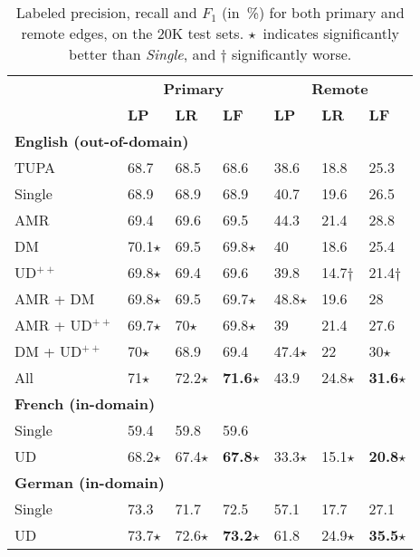 \documentclass[11pt,a4paper]{article}
\begin{document}
\begin{table}[t]
\centering
\small
\setlength\tabcolsep{3pt}
\begin{tabular}{l|lll|lll}
& \multicolumn{3}{c|}{\footnotesize \bf Primary} & \multicolumn{3}{c}{\footnotesize \bf Remote} \\
& \footnotesize \textbf{LP} & \footnotesize \textbf{LR} & \footnotesize \textbf{LF}
& \footnotesize \textbf{LP} & \footnotesize \textbf{LR} & \footnotesize \textbf{LF} \\
\hline
\multicolumn{4}{l|}{\small \bf English (out-of-domain)} & \\
\footnotesize TUPA
& 68.7 & 68.5 & 68.6 & 38.6 & 18.8 & 25.3 \\
\footnotesize Single
& 68.9 & 68.9 & 68.9 & 40.7 & 19.6 & 26.5 \\
\cline{1-1}
\footnotesize AMR
& 69.4 & 69.6 & 69.5 & 44.3 & 21.4 & 28.8 \\
\footnotesize DM
& 70.1$\star$ & 69.5 & 69.8$\star$ & 40 & 18.6 & 25.4 \\
\footnotesize UD$^{++}$
& 69.8$\star$ & 69.4 & 69.6 & 39.8 & 14.7$\dagger$ & 21.4$\dagger$ \\
\footnotesize AMR + DM
& 69.8$\star$ & 69.5 & 69.7$\star$ & 48.8$\star$ & 19.6 & 28 \\
\footnotesize AMR + UD$^{++}$
& 69.7$\star$ & 70$\star$ & 69.8$\star$ & 39 & 21.4 & 27.6 \\
\footnotesize DM + UD$^{++}$
& 70$\star$ & 68.9 & 69.4 & 47.4$\star$ & 22 & 30$\star$ \\
\footnotesize All
& 71$\star$ & 72.2$\star$ & \textbf{71.6}$\star$ & 43.9 & 24.8$\star$ & \textbf{31.6}$\star$ \\
\hline
\multicolumn{4}{l|}{\small \bf French (in-domain)} & \\
\small Single & 59.4 & 59.8 & 59.6 & \enskip 5.9 & \enskip 1.9 & \enskip 2.9 \\
\small UD & 68.2$\star$ & 67.4$\star$ & \textbf{67.8}$\star$ & 33.3$\star$ & 15.1$\star$ & \textbf{20.8}$\star$ \\
\hline
\multicolumn{4}{l|}{\small \bf German (in-domain)} & \\
\small Single & 73.3 & 71.7 & 72.5 & 57.1 & 17.7 & 27.1 \\
\small UD & 73.7$\star$ & 72.6$\star$ & \textbf{73.2}$\star$ & 61.8 & 24.9$\star$ & \textbf{35.5}$\star$
\end{tabular}
\caption{
Labeled precision, recall and $F_1$ (in~\%) for both primary and remote edges,
on the 20K test sets.
$\star$~indicates significantly better than \textit{Single},
and $\dagger$ significantly worse.
}
\label{tab:ood_results}
\end{table}
\end{document}
